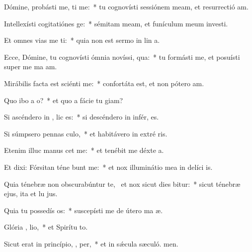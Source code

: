 \item Dómine, probásti me,  ti me:~* tu cognovísti sessiónem meam, et resurrectió am.
\item Intellexísti cogitatiónes   ge:~* sémitam meam, et funículum meum investi.
\item Et omnes vias me ti:~* quia non est sermo in lin a.
\item Ecce, Dómine, tu cognovísti ómnia novíssi,  qua:~* tu formásti me, et posuísti super me ma am.
\item Mirábilis facta est sciénti   me:~* confortáta est, et non pótero  am.
\item Quo ibo a  o?~* et quo a fácie tu giam?
\item Si ascéndero in ,  lic es:~* si descéndero in infér, es.
\item Si súmpsero pennas  culo,~* et habitávero in extré ris.
\item Etenim illuc manus  cet me:~* et tenébit me déxte a.
\item Et dixi: Fórsitan téne bunt me:~* et nox illuminátio mea in delíci is.
\item Quia ténebræ non obscurabúntur  te,~\pscross{} et nox sicut dies bitur:~* sicut ténebræ ejus, ita et lu jus.
\item Quia tu possedís  os:~* suscepísti me de útero ma æ.
\item Glória ,  lio,~* et Spirítu to.
\item Sicut erat in princípio,  ,  per,~* et in sǽcula sæculó. men.
